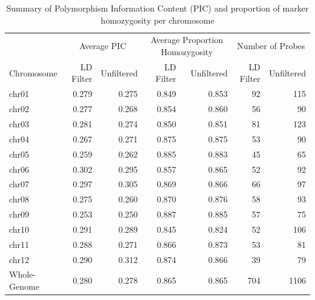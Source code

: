 \begin{table}

\caption{Summary of Polymorphism Information Content (PIC) and proportion of marker homozygosity per chromosome}
\centering
\begin{tabular}[t]{lrrrrrr}
\toprule
\multicolumn{1}{c}{} & \multicolumn{2}{c}{Average PIC} & \multicolumn{2}{c}{Average Proportion Homozygosity} & \multicolumn{2}{c}{Number of Probes} \\
\cmidrule(l{3pt}r{3pt}){2-3} \cmidrule(l{3pt}r{3pt}){4-5} \cmidrule(l{3pt}r{3pt}){6-7}
Chromosome & LD Filter & Unfiltered & LD Filter & Unfiltered & LD Filter & Unfiltered\\
\midrule
chr01 & 0.279 & 0.275 & 0.849 & 0.853 & 92 & 115\\
chr02 & 0.277 & 0.268 & 0.854 & 0.860 & 56 & 90\\
chr03 & 0.281 & 0.274 & 0.850 & 0.851 & 81 & 123\\
chr04 & 0.267 & 0.271 & 0.875 & 0.875 & 53 & 90\\
chr05 & 0.259 & 0.262 & 0.885 & 0.883 & 45 & 65\\
\addlinespace
chr06 & 0.302 & 0.295 & 0.857 & 0.865 & 52 & 92\\
chr07 & 0.297 & 0.305 & 0.869 & 0.866 & 66 & 97\\
chr08 & 0.275 & 0.260 & 0.870 & 0.876 & 58 & 93\\
chr09 & 0.253 & 0.250 & 0.887 & 0.885 & 57 & 75\\
chr10 & 0.291 & 0.289 & 0.845 & 0.824 & 52 & 106\\
\addlinespace
chr11 & 0.288 & 0.271 & 0.866 & 0.873 & 53 & 81\\
chr12 & 0.290 & 0.312 & 0.874 & 0.866 & 39 & 79\\
Whole-Genome & 0.280 & 0.278 & 0.865 & 0.865 & 704 & 1106\\
\bottomrule
\end{tabular}
\end{table}

